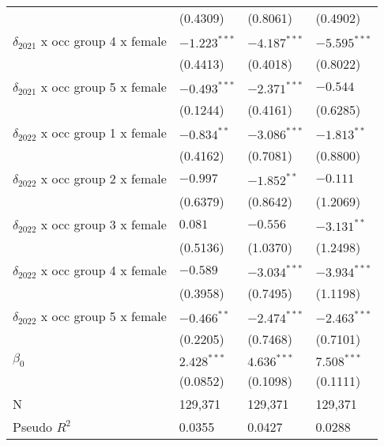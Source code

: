 \begin{tabular}{llll}
                                       &           (0.4309) &           (0.8061) &           (0.4902) \\
$\delta_{2021}$ x occ group 4 x female &     $-1.223^{***}$ &     $-4.187^{***}$ &     $-5.595^{***}$ \\
                                       &           (0.4413) &           (0.4018) &           (0.8022) \\
$\delta_{2021}$ x occ group 5 x female &     $-0.493^{***}$ &     $-2.371^{***}$ &           $-0.544$ \\
                                       &           (0.1244) &           (0.4161) &           (0.6285) \\
$\delta_{2022}$ x occ group 1 x female &      $-0.834^{**}$ &     $-3.086^{***}$ &      $-1.813^{**}$ \\
                                       &           (0.4162) &           (0.7081) &           (0.8800) \\
$\delta_{2022}$ x occ group 2 x female &           $-0.997$ &      $-1.852^{**}$ &           $-0.111$ \\
                                       &           (0.6379) &           (0.8642) &           (1.2069) \\
$\delta_{2022}$ x occ group 3 x female &            $0.081$ &           $-0.556$ &      $-3.131^{**}$ \\
                                       &           (0.5136) &           (1.0370) &           (1.2498) \\
$\delta_{2022}$ x occ group 4 x female &           $-0.589$ &     $-3.034^{***}$ &     $-3.934^{***}$ \\
                                       &           (0.3958) &           (0.7495) &           (1.1198) \\
$\delta_{2022}$ x occ group 5 x female &      $-0.466^{**}$ &     $-2.474^{***}$ &     $-2.463^{***}$ \\
                                       &           (0.2205) &           (0.7468) &           (0.7101) \\
$\beta_0$                              &      $2.428^{***}$ &      $4.636^{***}$ &      $7.508^{***}$ \\
                                       &           (0.0852) &           (0.1098) &           (0.1111) \\
N                                      &            129,371 &            129,371 &            129,371 \\
Pseudo $R^2$                           &             0.0355 &             0.0427 &             0.0288 \\
\bottomrule
\end{tabular}

